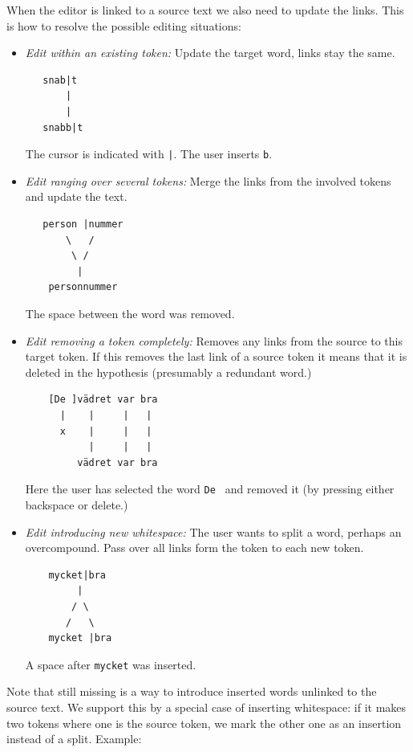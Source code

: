 \documentclass[10pt, a4paper]{article}
\newcommand{\dan}[1]{{\color{Fuchsia}{Dan: #1}}}
\begin{document}
When the editor is linked to a source text we also need to update the links.
This is how to resolve the possible editing situations:

\dan{
Examples in ascii-art for now!
I intend to make proper (small) screenshots of these on Monday.
}

\begin{itemize}

\item {\it Edit within an existing token:}
Update the target word, links stay the same.
\begin{verbatim}
   snab|t
       |
       |
   snabb|t
\end{verbatim}
The cursor is indicated with \verb!|!. The user inserts \verb!b!.

\item {\it Edit ranging over several tokens:}
Merge the links from the involved tokens and update the text.
\begin{verbatim}
   person |nummer
       \   /
        \ /
         |
    personnummer
\end{verbatim}
The space between the word was removed.

\item {\it Edit removing a token completely:}
Removes any links from the source to this target token.
If this removes the last link of a source token it means that
it is deleted in the hypothesis (presumably a redundant word.)
\begin{verbatim}
    [De ]vädret var bra
      |    |     |   |
      x    |     |   |
           |     |   |
         vädret var bra
\end{verbatim}
Here the user has selected the word \verb!De ! and removed it
(by pressing either backspace or delete.)

\item {\it Edit introducing new whitespace:}
The user wants to split a word, perhaps an overcompound.
Pass over all links form the token to each new token.
\begin{verbatim}
    mycket|bra
         |
        / \
       /   \
    mycket |bra
\end{verbatim}
A space after \verb!mycket! was inserted.
\end{itemize}

Note that still missing is a way to introduce inserted words
unlinked to the source text. We support this by a special case of
inserting whitespace: if it makes two tokens where one is the source
token, we mark the other one as an insertion instead of a split. Example:
\end{document}
